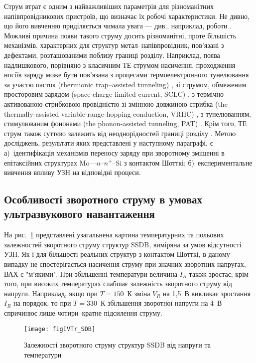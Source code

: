 Струм втрат є одним з найважливіших параметрів для різноманітних напівпровідникових пристроїв, що визначає їх робочі характеристики.
Не дивно, що його вивченню приділяється чимала увага --- див., наприклад, роботи \cite{Sathaiya,VRH:Shan,Pipinys2006,Referi1,Referi2}.
Можливі причина появи такого струму досить різноманітні, проте більшість механізмів, характерних для структур метал--напівпровідник,
пов'язані з дефектами, розташованими поблизу границі розділу.
Наприклад, поява надлишкового, порівняно з класичним ТЕ струмом насичення, проходження носіїв заряду може
бути пов'язана
з процесами термоелектронного тунелювання за участю пасток (thermionic trap--assisted tunneling) \cite{Sathaiya},
зі струмом, обмеженим просторовим зарядом (space-charge limited current, SCLC) \cite{Abu-Samaha,Jafar},
з термічно--активованою стрибковою провідністю зі змінною довжиною стрибка (the thermally-assisted variable-range-hopping conduction, VRHC) \cite{Jafar,VRH:Lee,VRH:Shan},
з тунелюванням, стимулюваним фононами (the phonon-assisted tunneling, PAT) \cite{Pipinys1999,Pipinys2006}.
Крім того, ТЕ струм також суттєво залежить від неоднорідностей границі розділу  \cite{Tung:MSE}.
Метою досліджень, результати яких представлені у наступному параграфі, є
а)~ідентифікація механізмів переносу заряду при зворотному зміщенні в епітаксійних структурах Mo---$n$--$n^+$--Si з контактом Шотткі;
б)~експериментальне вивчення впливу УЗН на відповідні процеси.

\subsection{Особливості зворотного струму в умовах ультразвукового навантаження}

На рис.~\ref{figIVTr_SDB} представлені узагальнена картина температурних та польових залежностей зворотного струму структур SSDB,
виміряна за умов відсутності УЗН.
Як і для більшості реальних структур з контактом Шотткі, в даному випадку не спостерігається насичення струму при
значних зворотних напругах, ВАХ є "м'якими".
При збільшенні температури величина $I_R$ також зростає;
крім того, при високих температурах слабшає залежність зворотного струму від напруги.
Наприклад, якщо при $T=150$~К зміна $V_R$ на 1,5~В викликає зростання $I_R$ на порядок,
то при $T=330$~К збільшення зворотної напруги на 4~В спричинює лише чотири--кратне підсилення струму.

\begin{figure}
\center
\texttt{[image: figIVTr\_SDB]}
\caption{\label{figIVTr_SDB}
Залежності зворотного струму структур SSDB від напруги та температури
}%
\end{figure}

